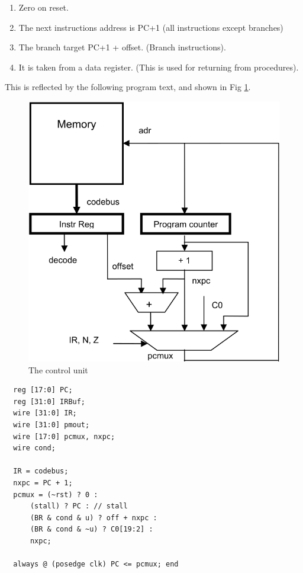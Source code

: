 \begin{enumerate}
  \item Zero on reset.
  \item The next instructions address is PC+1 (all instructions except branches)
  \item The branch target PC+1 + offset. (Branch instructions).
  \item It is taken from a data register. (This is used for returning from procedures).
\end{enumerate}

This is reflected by the following program text, and shown in Fig \ref{fig:cu}.

\begin{figure}[h!]
	\centering
	\includegraphics[width=.9\textwidth]{i/F/8.png}
	\caption{The control unit}
	\label{fig:cu}
\end{figure}

\begin{verbatim}
  reg [17:0] PC;
  reg [31:0] IRBuf;
  wire [31:0] IR;
  wire [31:0] pmout;
  wire [17:0] pcmux, nxpc;
  wire cond;
 
  IR = codebus;
  nxpc = PC + 1;
  pcmux = (~rst) ? 0 :
      (stall) ? PC : // stall
      (BR & cond & u) ? off + nxpc :
      (BR & cond & ~u) ? C0[19:2] :
      nxpc;
 
  always @ (posedge clk) PC <= pcmux; end
\end{verbatim}

